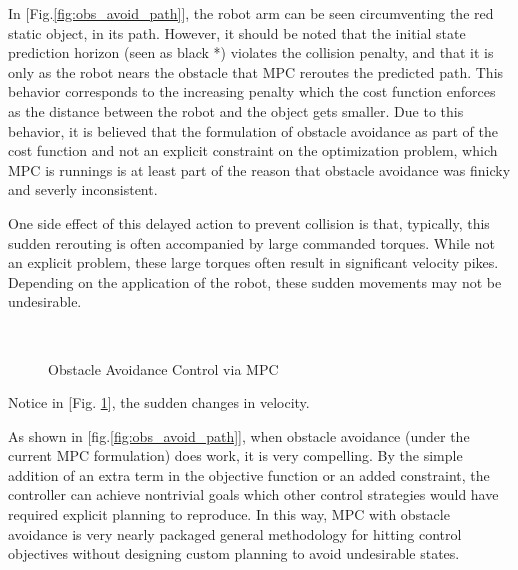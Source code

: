 \documentclass[journal]{IEEEtran}
\begin{document}
In [Fig.\ref{fig:obs_avoid_path}], the robot arm can be seen circumventing the red static object, in its path. However, it should be noted that the initial state prediction horizon (seen as black *) violates the collision penalty, and that it is only as the robot nears the obstacle that MPC reroutes the predicted path. This behavior corresponds to the increasing penalty which the cost function enforces as the distance between the robot and the object gets smaller. Due to this behavior, it is believed that the formulation of obstacle avoidance as part of the cost function and not an explicit constraint on the optimization problem, which MPC is runnings is at least part of the reason that obstacle avoidance was finicky and severly inconsistent.

One side effect of this delayed action to prevent collision is that, typically, this sudden rerouting is often accompanied by large commanded torques. While not an explicit problem, these large torques often result in significant velocity pikes. Depending on the application of the robot, these sudden movements may not be undesirable. \\

\begin{figure}[ht]%
    \centering
    \\
    \caption{Obstacle Avoidance Control via MPC}%
    \label{fig:obs_avoid_control_action}%
\end{figure}



\noindent Notice in [Fig. \ref{fig:obs_avoid_control_action}], the sudden changes in velocity.

As shown in [fig.\ref{fig:obs_avoid_path}], when obstacle avoidance (under the current MPC formulation) does work, it is very compelling. By the simple addition of an extra term in the objective function or an added constraint, the controller can achieve nontrivial goals which other control strategies would have required explicit planning to reproduce. In this way, MPC with obstacle avoidance is very nearly packaged general methodology for hitting control objectives without designing custom planning to avoid undesirable states. \\
\end{document}
